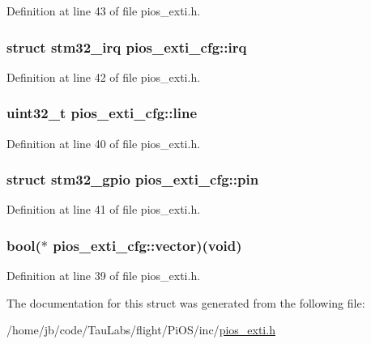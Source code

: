 \-Definition at line 43 of file pios\-\_\-exti.\-h.

\hypertarget{structpios__exti__cfg_a581dede4e7459e6a9586711e62c3fcc7}{
\subsubsection[{irq}]{\setlength{\rightskip}{0pt plus 5cm}struct {\bf stm32\-\_\-irq} {\bf pios\-\_\-exti\-\_\-cfg\-::irq}}}\label{structpios__exti__cfg_a581dede4e7459e6a9586711e62c3fcc7}


\-Definition at line 42 of file pios\-\_\-exti.\-h.

\hypertarget{structpios__exti__cfg_ac8acb6d5a45610f65ed2eb066216694b}{
\subsubsection[{line}]{\setlength{\rightskip}{0pt plus 5cm}uint32\-\_\-t {\bf pios\-\_\-exti\-\_\-cfg\-::line}}}\label{structpios__exti__cfg_ac8acb6d5a45610f65ed2eb066216694b}


\-Definition at line 40 of file pios\-\_\-exti.\-h.

\hypertarget{structpios__exti__cfg_a099174bef966c8ee8091cb1d00343a4b}{
\subsubsection[{pin}]{\setlength{\rightskip}{0pt plus 5cm}struct {\bf stm32\-\_\-gpio} {\bf pios\-\_\-exti\-\_\-cfg\-::pin}}}\label{structpios__exti__cfg_a099174bef966c8ee8091cb1d00343a4b}


\-Definition at line 41 of file pios\-\_\-exti.\-h.

\hypertarget{structpios__exti__cfg_a7fb58b83fd0a79e8aa956a683317723c}{
\subsubsection[{vector}]{\setlength{\rightskip}{0pt plus 5cm}bool($\ast$  {\bf pios\-\_\-exti\-\_\-cfg\-::vector})(void)}}\label{structpios__exti__cfg_a7fb58b83fd0a79e8aa956a683317723c}


\-Definition at line 39 of file pios\-\_\-exti.\-h.



\-The documentation for this struct was generated from the following file\-:\begin{DoxyCompactItemize}
\item 
/home/jb/code/\-Tau\-Labs/flight/\-Pi\-O\-S/inc/\hyperlink{pios__exti_8h}{pios\-\_\-exti.\-h}\end{DoxyCompactItemize}
